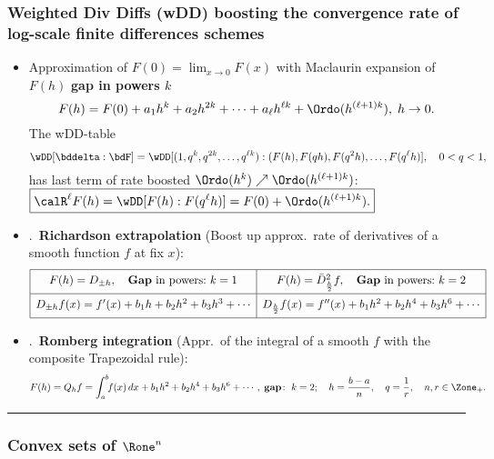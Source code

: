 \documentclass[a4paper]{article}
\begin{document}
\subsubsection*{Weighted Div Diffs (wDD) boosting the convergence rate of log-scale finite differences schemes} %

\begin{itemize}
\item
Approximation of $F(0)=\lim_{x\to0}F(x)$
with Maclaurin expansion of $F(h)$
\textbf{gap in powers $k$}
\[
  F(h) = F(0) + a_1h^k+a_2h^{2k}+\cdots+a_\ell h^{\ell k} + \Ordo(h^{(\ell+1)k}),\; h\to 0.
\]
The  wDD-table
\[
  \wDD[\bddelta:\bdF]
  =\wDD[(1,q^k,q^{2k},\ldots,q^{\ell k}):(F(h),F(qh),F(q^2h),\ldots,F(q^\ell h)], \quad 0<q<1,
\]
 has last term of rate boosted $\Ordo(h^k)\nearrow\Ordo(h^{(\ell+1)k})$:
 \/
\(
  \boxed{\calR^\ell F(h)=\wDD[F(h):F(q^\ell h)]=F(0) + \Ordo(h^{(\ell+1)k}).}
\)

\item \Ex.~\textbf{Richardson extrapolation}
  (Boost up approx.~rate of derivatives of a smooth function $f$ at fix $x$):
  \[
  \begin{array}{|c|c|}
    \hline \rule[0pt]{0pt}{12pt}
    F(h) = D_{\pm h}, \quad \text{\textbf{Gap} in powers:}~k=1
      & F(h) = \bar D^2_{\frac h2}f, \quad \text{\textbf{Gap} in powers:}~k=2
      \\[5pt]
    \hline \rule[0pt]{0pt}{12pt}
        D_{\pm h}f(x) = f'(x)+b_1h +b_2h^2+b_3h^3+\cdots
      & D_{\frac h2}f(x) = f''(x)+b_1h^2 +b_2h^4+b_3h^6+\cdots
      \\[5pt]
    \hline
  \end{array}
  \]
  \item \Ex.~\textbf{Romberg integration}
    (Appr.~of the integral of a smooth $f$ with the composite Trapezoidal rule):
    \[
      F(h)=Q_hf
      = \int_a^b \!\! f(x)\,dx +b_1h^2 +b_2h^4+b_3h^6+\cdots,
      \;\textbf{gap}\!:~k=2;\quad
      h=\frac{b-a}{n},\quad
      q=\frac1r,\quad
      n,r\in\Zone_+.
    \]
\end{itemize}


\medskip\hrule


\subsubsection*{Convex sets of $\Rone^n$}%
\end{document}

